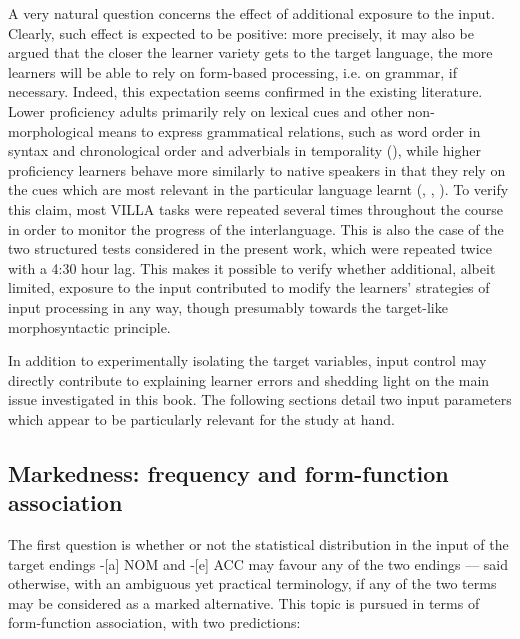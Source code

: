 A very natural question concerns the effect of additional exposure to the input. Clearly, such effect is expected to be positive: more precisely, it may also be argued that the closer the learner variety gets to the target language, the more learners will be able to rely on form-based processing, i.e. on grammar, if necessary. Indeed, this expectation seems confirmed in the existing literature. Lower proficiency adults primarily rely on lexical cues and other non-morphological means to express grammatical relations, such as word order in syntax and chronological order and adverbials in temporality (\citealt{Bardovi-Harlig2000, Lee2002, Leeser2004, EllisSagarra2010a}), while higher proficiency learners behave more similarly to native speakers in that they rely on the cues which are most relevant in the particular language learnt (\citealt{Bardovi-Harlig1992b}, \citeyear{Bardovi-Harlig2000}, \citealt{Giacalone-Ramat1992,  SkibaDittmar1992, DietrichEtAl1995, Starren2001, ParodiEtAl2006, BordagPechmann2007}). To verify this claim, most VILLA tasks were repeated several times throughout the course in order to monitor the progress of the interlanguage. This is also the case of the two structured tests considered in the present work, which were repeated twice with a 4:30 hour lag. This makes it possible to verify whether additional, albeit limited, exposure to the input contributed to modify the learners’ strategies of input processing in any way, though presumably towards the target-like morphosyntactic principle.

In addition to experimentally isolating the target variables, input control may directly contribute to explaining learner errors and shedding light on the main issue investigated in this book. The following sections detail two input parameters which appear to be particularly relevant for the study at hand. 

\subsection{Markedness: frequency and form-function association}\label{sec:01:4.1}

The first question is whether or not the statistical distribution in the input of the target endings -[a] NOM and -[e] ACC may favour any of the two endings — said otherwise, with an ambiguous \citep{Haspelmath2006} yet practical terminology, if any of the two terms may be considered as a marked alternative. This topic is pursued in terms of form-function association, with two predictions:

